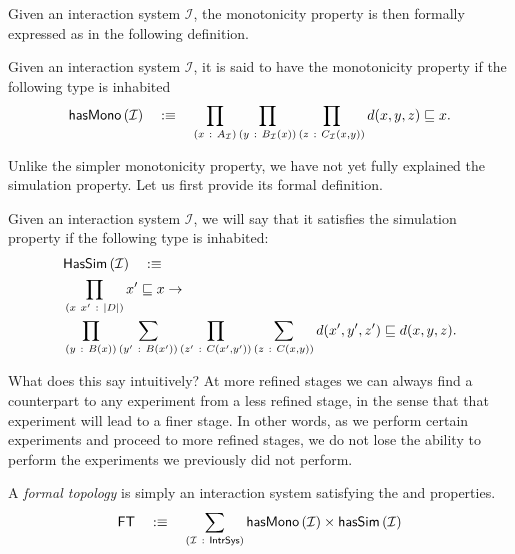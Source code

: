 Given an interaction system $\mathcal{I}$, the monotonicity property is then formally
expressed as in the following definition.
\begin{defn}\label{defn:mono}
  Given an interaction system $\mathcal{I}$, it is said to have the monotonicity property
  if the following type is inhabited
  \begin{equation*}
    \hasmono{\mathcal{I}} \quad\is\quad
      \pity{x}{A_{\mathcal{I}}}{\pity{y}{B_{\mathcal{I}}(x)}{\pity{z}{C_{\mathcal{I}}(x, y)}{
        d(x, y, z) \sqsubseteq x}}.
      }
  \end{equation*}
\end{defn}

Unlike the simpler monotonicity property, we have not yet fully explained the simulation
property. Let us first provide its formal definition.
\begin{defn}\label{defn:sim}
  Given an interaction system $\mathcal{I}$, we will say that it satisfies the simulation
  property if the following type is inhabited:
  \begin{align*}
    &\mathsf{HasSim}\left( \mathcal{I} \right) \quad\is \\
    &\pity{x~x'}{\abs{D}}{
      x' \sqsubseteq x \rightarrow\\
      &\pity{y}{B(x)}{
        \sigmaty{y'}{B(x')}{
          \pity{z'}{C(x', y')}{
            \sigmaty{z}{C(x, y)}{
              d(x', y', z') \sqsubseteq d(x, y, z)
            }
          }
        }
      }
    }.
  \end{align*}
\end{defn}
What does this say intuitively? At more refined stages we can always find a counterpart to
any experiment from a less refined stage, in the sense that that experiment will lead to a
finer stage. In other words, as we perform certain experiments and proceed to more refined
stages, we do not lose the ability to perform the experiments we previously did not
perform.

\begin{defn}\label{defn:formal-topo}
  A \emph{formal topology} is simply an interaction system satisfying the \vermono{} and
  \versim{} properties.
  \begin{align*}
    \mathsf{FT} \quad\is\quad \sigmaty{\mathcal{I}}{\mathsf{IntrSys}}{
        \hasmono{\mathcal{I}} \times \hassim{\mathcal{I}}
    }
  \end{align*}
\end{defn}

